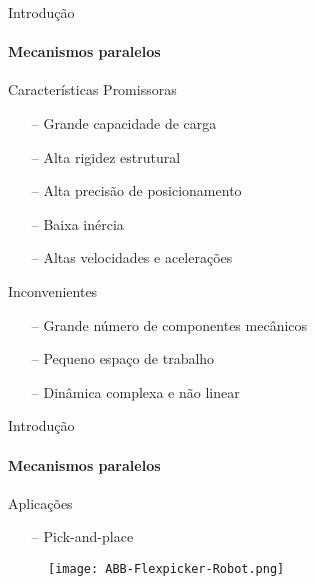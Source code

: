 \documentclass[25pt,landscape]{beamer}
\begin{document}
\begin{frame}
    \titlepage
\end{frame}

\begin{frame}{Introdução}
    \framesubtitle{Mecanismos paralelos}
    \begin{block}{Caracter\'isticas Promissoras}
        \begin{itemize} 
            \item[--] Grande capacidade de carga \\[8pt]
            \item[--] Alta rigidez estrutural \\[8pt]
            \item[--] Alta precis\~ao de posicionamento \\[8pt]
            \item[--] Baixa in\'ercia \\[8pt]
            \item[--] Altas velocidades e acelera\c{c}\~oes \\[8pt]
        \end{itemize}
    \end{block}
    \begin{block}{Inconvenientes}
        \begin{itemize}
        	\item[--] Grande n\'umero de componentes mec\^anicos \\[8pt]
            \item[--] Pequeno espaço de trabalho \\[8pt]
            \item[--] Din\^amica complexa e n\~ao linear \\[8pt]
        \end{itemize}
    \end{block}
\end{frame}

\begin{frame}{Introdução}
    \framesubtitle{Mecanismos paralelos}
    \begin{block}{Aplica\c{c}\~oes}
        \begin{itemize}
            \item[--] Pick-and-place
        \end{itemize}
    \end{block}
    \begin{figure}[!h]
        \centering
        \texttt{[image: ABB-Flexpicker-Robot.png]}
    \end{figure}  
\end{frame}
\end{document}
